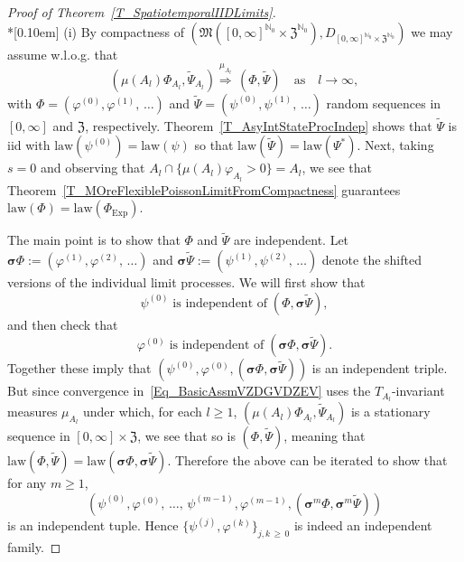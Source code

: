 \documentclass[AHL,Unicode,longabstracts]{cedram}
\newcommand{\Expl}{\mathrm{Exp}}
\newcommand{\law}{\mathrm{law}}
\newcommand{\bfsig}{\boldsymbol{\sigma}}
\newcommand{\frkZ}{\mathfrak{Z}}
\newcommand{\frkM}{\mathfrak{M}}
\newcommand{\bbN}{\mathbb{N}}
\begin{document}
\begin{proof}[{Proof of Theorem~\ref{T_SpatiotemporalIIDLimits}}]\ \\*[0.10em]
\noindent(i) \label{prooftheo5.3.i} By compactness of $(\frkM([0,\infty]^{\bbN_{0}}\times\frkZ ^{\bbN_{0}}),D_{[0,\infty]^{\bbN_{0}}\times\frkZ ^{\bbN_{0}}})$ we may assume w.l.o.g. that
\begin{equation}\label{Eq_BasicAssmVZDGVDZEV}
\left(\mu(A_{l})\Phi_{A_{l}},\widetilde{\Psi}_{A_{l}}\right)\overset{\mu_{A_{l}} }{\Longrightarrow}\,\left(\Phi,\widetilde{\Psi}\right)\quad\text{as}\quad l\rightarrow
\infty, 
\end{equation}
with $\Phi=(\varphi^{(0)},\varphi^{(1)},\,\ldots)$ and $\widetilde{\Psi} =(\psi^{(0)},\psi^{(1)},\,\ldots)$ random sequences in $[0,\infty]$ and $\frkZ$, respectively. Theorem~\ref{T_AsyIntStateProcIndep} shows that $\widetilde{\Psi}$ is iid with $\law(\psi^{(0)})=\law(\psi)$ so that $\law(\widetilde{\Psi})=\law(\Psi^{\ast})$. Next, taking $s=0$ and observing that $A_{l}\cap\{\mu(A_{l})\varphi_{A_{l} }>0\}=A_{l}$, we see that Theorem~\ref{T_MOreFlexiblePoissonLimitFromCompactness} guarantees $\law (\Phi)=\law(\Phi_{\Expl})$.


The main point is to show that $\Phi$ and $\widetilde{\Psi}$ are independent. Let $\bfsig\Phi:=(\varphi^{(1)},\varphi^{(2)},\,\ldots)$ and $\bfsig\widetilde{\Psi}:=(\psi^{(1)},\psi^{(2)},\,\ldots)$ denote the shifted versions of the individual limit processes. We will first show that
\begin{equation}\label{Eq_TwistIndependence1}
\psi^{(0)}\;\text{is independent of}\;\left(\Phi,\bfsig
\widetilde{\Psi}\right),
\end{equation}
and then check that
\begin{equation}\label{Eq_TwistIndependence2}
\varphi^{(0)}\;\text{is independent of}\;\left(\bfsig
\Phi,\bfsig\widetilde{\Psi}\right).
\end{equation}
Together these imply that $(\psi^{(0)},\varphi^{(0)},(\bfsig
\Phi,\bfsig\widetilde{\Psi}))$ is an independent triple. But since convergence in~\eqref{Eq_BasicAssmVZDGVDZEV} uses the $T_{A_{l}}$-invariant measures $\mu_{A_{l}}$ under which, for each $l\geq1$, $(\mu(A_{l})\Phi _{A_{l}},\widetilde{\Psi}_{A_{l}})$ is a stationary sequence in $[0,\infty]\times\frkZ$, we see that so is $(\Phi,\widetilde{\Psi})$, meaning that $\law(\Phi,\widetilde{\Psi})=\law(\bfsig
\Phi,\bfsig\widetilde{\Psi})$. Therefore the above can be iterated to show that for any $m\geq1$, 
\[
\left(\psi^{(0)},\varphi^{(0)},\,\ldots,\,\psi ^{(m-1)},\varphi^{(m-1)},\left(\bfsig^{m}\Phi,\bfsig ^{m}\widetilde{\Psi}\right)\right)
\]
is an independent tuple. Hence $\{\psi^{(j)},\varphi^{(k)}\}_{j,k\,\geq\,0}$ is indeed an independent family.


\end{proof}
\end{document}
